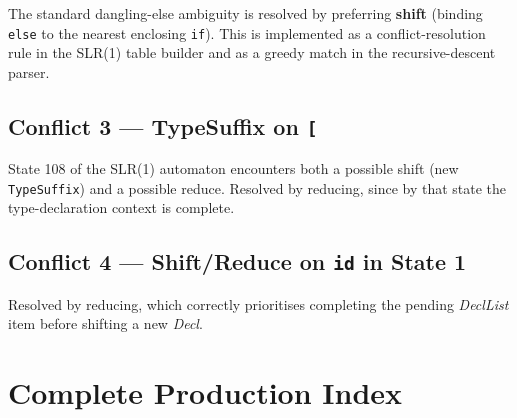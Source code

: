 \documentclass[12pt,a4paper]{article}
\begin{document}
The standard dangling-else ambiguity is resolved by preferring \textbf{shift}
(binding \texttt{else} to the nearest enclosing \texttt{if}). This is implemented
as a conflict-resolution rule in the SLR(1) table builder and as a greedy match
in the recursive-descent parser.

\subsection{Conflict 3 --- TypeSuffix on \texttt{[}}

State 108 of the SLR(1) automaton encounters both a possible shift (new
\texttt{TypeSuffix}) and a possible reduce. Resolved by reducing, since by
that state the type-declaration context is complete.

\subsection{Conflict 4 --- Shift/Reduce on \texttt{id} in State 1}

Resolved by reducing, which correctly prioritises completing the pending
\textit{DeclList} item before shifting a new \textit{Decl}.

\section{Complete Production Index}
\end{document}
